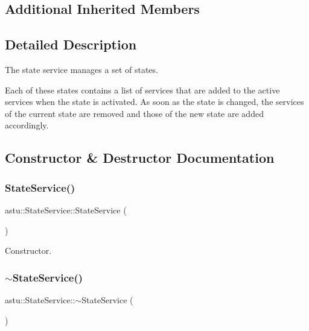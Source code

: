 \subsection*{Additional Inherited Members}


\subsection{Detailed Description}
The state service manages a set of states.

Each of these states contains a list of services that are added to the active services when the state is activated. As soon as the state is changed, the services of the current state are removed and those of the new state are added accordingly. 

\subsection{Constructor \& Destructor Documentation}
\mbox{\label{classastu_1_1StateService_ae8be300ce5fd92351d52fc7162ce9793}} 
\subsubsection{\texorpdfstring{State\+Service()}{StateService()}}
{\footnotesize\ttfamily astu\+::\+State\+Service\+::\+State\+Service (\begin{DoxyParamCaption}{ }\end{DoxyParamCaption})}

Constructor. \mbox{\label{classastu_1_1StateService_a27bbe3ef0f9a4600c559ca9f6def3f5f}} 
\subsubsection{\texorpdfstring{$\sim$\+State\+Service()}{~StateService()}}
{\footnotesize\ttfamily astu\+::\+State\+Service\+::$\sim$\+State\+Service (\begin{DoxyParamCaption}{ }\end{DoxyParamCaption})\hspace{0.3cm}{\ttfamily [inline]}}

